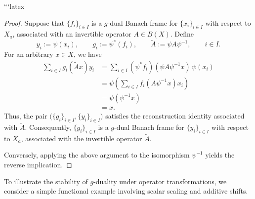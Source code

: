 \documentclass[12pt]{article}
\theoremstyle{definition}
\theoremstyle{remark}
\begin{document}
```latex
\begin{proof}
	Suppose that \(\{f_i\}_{i\in I}\) is a \(g\)-dual Banach frame for
	\(\{x_i\}_{i\in I}\) with respect to \(X_a\), associated with an
	invertible operator \(A\in B(X)\). Define
	\[
	y_i:=\psi(x_i),\qquad
	g_i:=\psi^*(f_i),\qquad
	\widetilde{A}:=\psi A\psi^{-1},
	\qquad i\in I.
	\]
	For an arbitrary \(x\in X\), we have
	\[
	\begin{aligned}
		\sum_{i\in I} g_i(\widetilde{A}x)y_i
		&=\sum_{i\in I}
		(\psi^*f_i)(\psi A\psi^{-1}x)\,\psi(x_i)\\
		&=\psi\left(
		\sum_{i\in I}
		f_i(A\psi^{-1}x)x_i
		\right)\\
		&=\psi(\psi^{-1}x)\\
		&=x.
	\end{aligned}
	\]
	Thus, the pair
	\(\big(\{g_i\}_{i\in I},\{y_i\}_{i\in I}\big)\)
	satisfies the reconstruction identity associated with
	\(\widetilde{A}\). Consequently,
	\(\{g_i\}_{i\in I}\) is a \(g\)-dual Banach frame for
	\(\{y_i\}_{i\in I}\) with respect to \(X_a\), associated with
	the invertible operator \(\widetilde{A}\).
	
	Conversely, applying the above argument to the isomorphism
	\(\psi^{-1}\) yields the reverse implication.
\end{proof}


\noindent

To illustrate the stability of \(g\)-duality under operator transformations, we consider a simple functional example involving scalar scaling and additive shifts.
\end{document}

